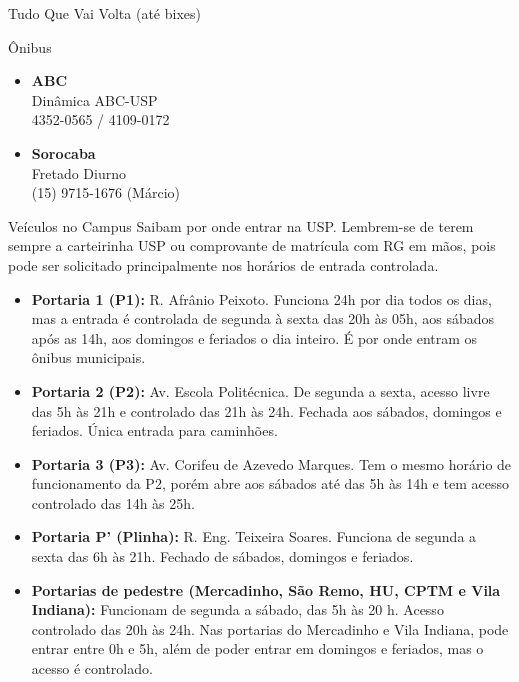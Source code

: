 \begin{secao}{Tudo Que Vai Volta (até bixes)}
\begin{subsecao}{Ônibus}
\begin{itemize}
  \item {\bf ABC}\\
    Dinâmica ABC-USP\\
    4352-0565 / 4109-0172

  \item {\bf Sorocaba}\\
    Fretado Diurno\\
    (15) 9715-1676 (Márcio)

\end{itemize}

\end{subsecao}


\begin{subsecao}{Veículos no Campus}
Saibam por onde entrar na USP. Lembrem-se de terem sempre a carteirinha USP ou
comprovante de matrícula com RG em mãos, pois pode ser solicitado principalmente
nos horários de entrada controlada.
\begin{itemize}
  \item {\bf Portaria 1 (P1):} R. Afrânio Peixoto. Funciona 24h por dia todos os
    dias, mas a entrada é controlada de segunda à sexta das 20h às 05h, aos sábados
    após as 14h, aos domingos e feriados o dia inteiro. É por onde entram os 
    ônibus municipais.

  \item {\bf Portaria 2 (P2):} Av. Escola Politécnica. De segunda a sexta, acesso
  livre das 5h às 21h e controlado das 21h às 24h. Fechada aos sábados, domingos 
  e feriados. Única entrada para caminhões.

  \item {\bf Portaria 3 (P3):} Av. Corifeu de Azevedo Marques. Tem o mesmo horário
    de funcionamento da P2, porém abre aos sábados até das 5h às 14h e tem acesso
    controlado das 14h às 25h.

  \item {\bf Portaria P' (Plinha):} R. Eng. Teixeira Soares. Funciona de segunda a 
  sexta das 6h às 21h. Fechado de sábados, domingos e feriados.


\end{itemize}
\begin{itemize}

  \item {\bf Portarias de pedestre (Mercadinho, São Remo, HU, CPTM e
      Vila Indiana):} Funcionam de segunda a sábado, das 5h às 20 h. Acesso controlado das 20h
      às 24h. Nas portarias do Mercadinho e Vila Indiana, pode entrar entre 0h e 5h, além
      de poder entrar em domingos e feriados, mas o acesso é controlado.


\end{itemize}
\end{subsecao}
\end{secao}
